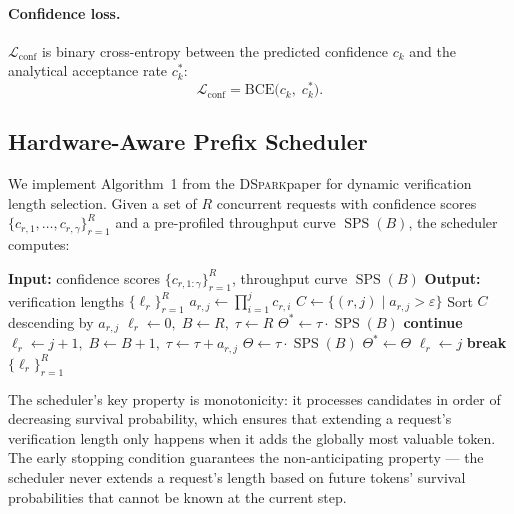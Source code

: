 \documentclass[11pt,a4paper]{article}
\newcommand{\DSpark}{\textsc{DSpark}}
\DeclareMathOperator{\SPS}{SPS}
\begin{document}
\paragraph{Confidence loss.}
$\mathcal{L}_\text{conf}$ is binary cross-entropy between the predicted
confidence $c_k$ and the analytical acceptance rate $c_k^*$:
\begin{equation}
  \mathcal{L}_\text{conf} = \text{BCE}\bigl(c_k,\; c_k^*\bigr).
\end{equation}

\subsection{Hardware-Aware Prefix Scheduler}
\label{subsec:scheduler}

We implement Algorithm~1 from the \DSpark paper for dynamic verification
length selection. Given a set of $R$ concurrent requests with confidence
scores $\{c_{r,1}, \ldots, c_{r,\gamma}\}_{r=1}^R$ and a pre-profiled
throughput curve $\SPS(B)$, the scheduler computes:

\begin{algorithm}[t]
\caption{Hardware-Aware Prefix Scheduler (Algorithm~1)}
\label{alg:scheduler}
\begin{algorithmic}[1]
\State \textbf{Input:} confidence scores $\{c_{r,1:\gamma}\}_{r=1}^R$, throughput curve $\SPS(B)$
\State \textbf{Output:} verification lengths $\{\ell_r\}_{r=1}^R$
  \State $a_{r,j} \gets \prod_{i=1}^j c_{r,i}$ 
\EndFor
\State $C \gets \{(r,j) \mid a_{r,j} > \varepsilon\}$ 
\State Sort $C$ descending by $a_{r,j}$
\State $\ell_r \gets 0,\; B \gets R,\; \tau \gets R$ 
\State $\Theta^* \gets \tau \cdot \SPS(B)$
   
    \State \textbf{continue}
  \EndIf
  \State $\ell_r \gets j+1,\; B \gets B+1,\; \tau \gets \tau + a_{r,j}$
  \State $\Theta \gets \tau \cdot \SPS(B)$
  \If{$\Theta > \Theta^*$}
    \State $\Theta^* \gets \Theta$
  \Else
    \State $\ell_r \gets j$ 
    \State \textbf{break}
  \EndIf
\EndFor
\State \Return $\{\ell_r\}_{r=1}^R$
\end{algorithmic}
\end{algorithm}

The scheduler's key property is monotonicity: it processes candidates in
order of decreasing survival probability, which ensures that extending a
request's verification length only happens when it adds the globally most
valuable token. The early stopping condition guarantees the
non-anticipating property --- the scheduler never extends a request's
length based on future tokens' survival probabilities that cannot be
known at the current step.
\end{document}
